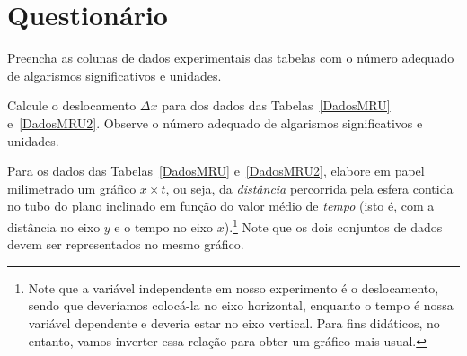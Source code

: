 
\vspace{15mm}

\begin{fullwidth}
\noindent{}
\vspace{5mm}

\noindent{}

\noindent{}

\noindent{}

\noindent{}

\noindent{}
\end{fullwidth}

\vspace{5mm}

\section{Questionário}

\begin{question}[type={exam}]{2}
Preencha as colunas de dados experimentais das tabelas com o número adequado de algarismos significativos e unidades.
\end{question}

\begin{question}[type={exam}]{2}
Calcule o deslocamento $\Delta x$ para dos dados das Tabelas~\ref{DadosMRU} e~\ref{DadosMRU2}. Observe o número adequado de algarismos significativos e unidades.
\end{question}

\begin{question}[type={exam}]{3}
Para os dados das Tabelas~\ref{DadosMRU} e~\ref{DadosMRU2}, elabore em papel milimetrado um gráfico $x \times t$, ou seja, da \emph{distância} percorrida pela esfera contida no tubo do plano inclinado em função do valor médio de \emph{tempo} (isto é, com a distância no eixo $y$ e o tempo no eixo $x$).\footnote{Note que a variável independente em nosso experimento é o deslocamento, sendo que deveríamos colocá-la no eixo horizontal, enquanto o tempo é nossa variável dependente e deveria estar no eixo vertical. Para fins didáticos, no entanto, vamos inverter essa relação para obter um gráfico mais usual.} Note que os dois conjuntos de dados devem ser representados no mesmo gráfico.
\end{question}

